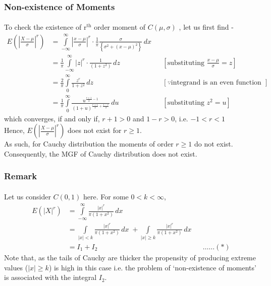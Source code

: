 \documentclass[12pt, fleqn, a4paper]{article}
\newcommand{\chy}{\(\mathit{C}(\mu, \sigma)\) }
\begin{document}
	\subsubsection{Non-existence of Moments} \label{NEM}
	\paragraph{} To check the existence of \(\mathrm{r^{th}}\) order moment of \chy, let us first find - 
	\begin{align*}
		E\left(\left|\frac{X-\mu}{\sigma}\right|^r\right)
		&=\int\limits_{-\infty}^{\infty}\left|\frac{x-\mu}{\sigma}\right|^r\cdot \frac{1}{\pi} \frac{\sigma}{\left\{\sigma^2 +(x-\mu)^2\right\}}\,dx \\
		&= \frac{1}{\pi}\int\limits_{-\infty}^{\infty} |z|^r \cdot\frac{1}{(1+z^2)}\,dz && \left[\text{substituting } \frac{x-\mu}{\sigma}=z \right] \\ 
		&= \frac{2}{\pi}\int\limits_{0}^{\infty} \frac{z^r}{1+z^2}\,dz && [\because\text{integrand is an even function of z}] \\
		&= \frac{1}{\pi}\int\limits_{0}^{\infty} \frac{u^{\frac{r+1}{2}-1}}{(1+u)^{\frac{r+1}{2}+\frac{1-r}{2}}}\,du && [\text{substituting }z^2=u]
	\end{align*}
	which converges, if and only if, \(r+1>0\) and \(1-r>0\), i.e. \(-1<r<1\) \\
	Hence, \(E\left(\left|\frac{X-\mu}{\sigma}\right|^r\right)\) does not exist for \(r\geq1\). \\ As such, for Cauchy distribution the moments of order \(r\geq1\) do not exist. Consequently, the MGF of Cauchy distribution does not exist.
	
	\subsubsection*{Remark}
	\paragraph{} Let us consider \(\mathit{C}(0,1)\) here. For some \(0<k<\infty\), 
	\begin{align*}
		E\left(|X|^r\right)&=\int\limits_{-\infty}^{\infty}\frac{|x|^r}{\pi(1+x^2)}\,dx \\
		&=\int\limits_{|x|<k}\frac{|x|^r}{\pi(1+x^2)}\,dx\; + \int\limits_{|x|\geq k} \frac{|x|^r}{\pi(1+x^2)}\,dx \\ 
		&=I_1 + I_2 && \ldots\ldots (*)
	\end{align*} 
	Note that, as the tails of Cauchy are thicker the propensity of producing extreme values (\(|x|\geq k\)) is high in this case i.e. the problem of `non-existence of moments' is associated with the integral \(I_2\). 
	
\end{document}
